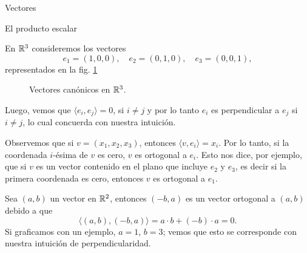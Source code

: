 \begin{chapter}{Vectores}
\begin{section}{El producto escalar}
        \begin{ejemplo*}
            En  $\mathbb R^3$ consideremos los vectores
            \begin{equation*}
            e_1 = (1,0,0),\quad e_2 = (0, 1,0),\quad e_3 = (0,0,1),
            \end{equation*}
            representados en la fig. \ref{fig-canonicos-en-R3}
            \begin{figure}[h]
            	\centering
                \caption{Vectores canónicos en $\mathbb R^3$.}
                \label{fig-canonicos-en-R3}
            \end{figure}
            
            Luego, vemos que $\langle e_i , e_j \rangle = 0$, si $i \ne j$ y por lo tanto $e_i$  es perpendicular a $e_j$ si $i \ne j$, lo cual concuerda con nuestra intuición. 
        \end{ejemplo*} 
            
            Observemos que si $v = (x_1,x_2,x_3)$,  entonces $\langle v , e_i \rangle = x_i$. Por lo tanto,  si la coordenada $i$-ésima de $v$ es cero,  $v$  es ortogonal a $e_i$. Esto nos dice,  por ejemplo,  que si $v$  es un vector contenido en el plano que incluye $e_2$ y $e_3$,  es decir si la primera coordenada es cero,  entonces $v$  es ortogonal a $e_1$. 
            
        
        \begin{ejemplo*} Sea $(a,b)$ un vector en $\mathbb R^2$, entonces $(-b,a)$ es un vector ortogonal a $(a,b)$ debido a que
            \begin{equation*}
                \langle (a,b) , (-b,a) \rangle = a\cdot b + (-b) \cdot a = 0.
            \end{equation*}
            Si graficamos con un ejemplo, $a=1$, $b=3$; vemos que esto se corresponde con nuestra intuición de perpendicularidad. 
                

\end{ejemplo*}
\end{section}
\end{chapter}
